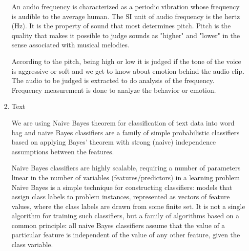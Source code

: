 \begin{enumerate}
	An audio frequency  is characterized as a periodic vibration whose frequency is audible to the average human. The SI unit of audio frequency is the hertz (Hz). It is the property of sound that most determines pitch. Pitch is the quality that makes it possible to judge sounds as "higher" and "lower" in the sense associated with musical melodies.
	
	
	
	According to the pitch, being high or low it is judged if the tone of the voice is aggressive or soft and we get to know about emotion behind the audio clip. The audio to be judged is extracted to do analysis of the frequency. Frequency measurement is done to analyze the behavior or emotion.
	
	\item Text
	
	We are using Naive Bayes theorem for classification of text data into word bag and naive Bayes classifiers are a family of simple probabilistic classifiers based on applying Bayes' theorem with strong (naive) independence assumptions between the features.
	
	Naive Bayes classifiers are highly scalable, requiring a number of parameters linear in the number of variables (features/predictors) in a learning problem Naive Bayes is a simple technique for constructing classifiers: models that assign class labels to problem instances, represented as vectors of feature values, where the class labels are drawn from some finite set. It is not a single algorithm for training such classifiers, but a family of algorithms based on a common principle: all naive Bayes classifiers assume that the value of a particular feature is independent of the value of any other feature, given the class variable. 
\end{enumerate}